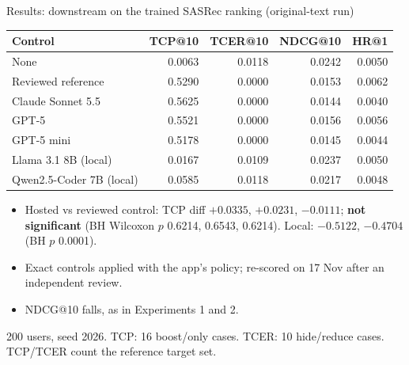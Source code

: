 \documentclass[10pt]{beamer}
\newcommand{\toprule}{\hline}
\newcommand{\midrule}{\hline}
\newcommand{\bottomrule}{\hline}
\newcommand{\src}[1]{\vfill{\tiny\color{bcitgray}#1}}
\begin{document}
\begin{frame}{Results: downstream on the trained SASRec ranking (original-text run)}
\footnotesize
\begin{tabular}{@{}lrrrr@{}}
\toprule
Control & TCP@10 & TCER@10 & NDCG@10 & HR@1\\\midrule
None & 0.0063 & 0.0118 & 0.0242 & 0.0050\\
Reviewed reference & 0.5290 & 0.0000 & 0.0153 & 0.0062\\
Claude Sonnet 5.5 & 0.5625 & 0.0000 & 0.0144 & 0.0040\\
GPT-5 & 0.5521 & 0.0000 & 0.0156 & 0.0056\\
GPT-5 mini & 0.5178 & 0.0000 & 0.0145 & 0.0044\\
Llama 3.1 8B (local) & 0.0167 & 0.0109 & 0.0237 & 0.0050\\
Qwen2.5-Coder 7B (local) & 0.0585 & 0.0118 & 0.0217 & 0.0048\\
\bottomrule
\end{tabular}\par
\vspace{0.25cm}
\begin{itemize}
\item Hosted vs reviewed control: TCP diff $+0.0335$, $+0.0231$, $-0.0111$; \textbf{not significant} (BH Wilcoxon $p$ 0.6214, 0.6543, 0.6214). Local: $-0.5122$, $-0.4704$ (BH $p$ 0.0001).
\item Exact controls applied with the app's policy; re-scored on 17 Nov after an independent review.
\item NDCG@10 falls, as in Experiments 1 and 2.
\end{itemize}
\src{200 users, seed 2026. TCP: 16 boost/only cases. TCER: 10 hide/reduce cases. TCP/TCER count the reference target set.}
\end{frame}
\end{document}
